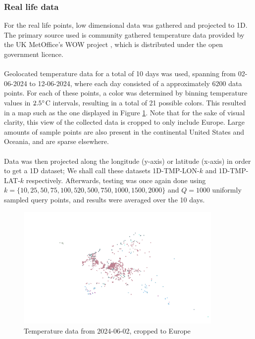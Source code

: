 \documentclass{article}
\newcommand{\fb}[1]{{\color{blue}#1}}
\begin{document}
\subsubsection*{Real life data}
For the real life points, low dimensional data was gathered and projected to 1D. The primary source used is community gathered temperature data provided by the UK MetOffice's WOW project \cite{Met}, which is distributed under the open government licence. \\\\
Geolocated temperature data for a total of 10 days was used, spanning from 02-06-2024 to 12-06-2024, where each day consisted of a approximately $6200$ data points. For each of these points, a color was determined by binning temperature values in $2.5\degree$C intervals, \fb{resulting in a total of 21 possible colors}. This resulted in a map such as the one displayed in Figure \ref{fig:temp-data}. Note that for the sake of visual clarity, this view of the collected data is cropped to only include Europe. Large amounts of sample points are also present in the continental United States and Oceania, and are sparse elsewhere. \\\\
Data was then projected along the longitude (y-axis) or latitude (x-axis) in order to get a 1D dataset; We shall call these datasets 1D-TMP-LON-$k$ and 1D-TMP-LAT-$k$ respectively. Afterwards, testing was once again done using $k=\{10, 25, 50, 75, 100, 520, 500, 750, 1000, 1500, 2000\}$ and $Q=1000$ uniformly sampled query points, and results were averaged over the 10 days.
\begin{figure}
    \centering
    \includegraphics[width=10cm]{figs/temperature-02-06-2024-cropped.png}
    \caption{Temperature data from 2024-06-02, cropped to Europe}
    \label{fig:temp-data}
\end{figure}
\end{document}
